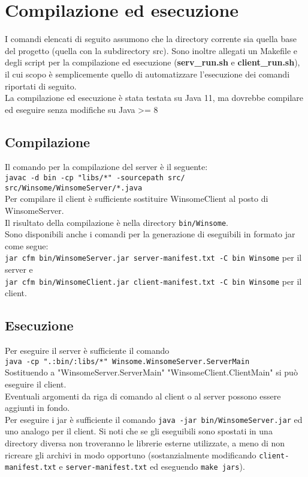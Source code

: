 \section{Compilazione ed esecuzione}
I comandi elencati di seguito assumono che la directory corrente sia quella base del progetto
(quella con la subdirectory src). Sono inoltre allegati un Makefile e degli script per la compilazione ed esecuzione (\textbf{serv\_run.sh} e \textbf{client\_run.sh}), il cui scopo è semplicemente quello di automatizzare l'esecuzione dei comandi riportati di seguito.\\
La compilazione ed esecuzione è stata testata su Java 11, ma dovrebbe compilare ed eseguire senza modifiche su Java >= 8

\subsection{Compilazione}
Il comando per la compilazione del server è il seguente:\\
\verb|javac -d bin -cp "libs/*" -sourcepath src/ src/Winsome/WinsomeServer/*.java|\\
Per compilare il client è sufficiente sostituire WinsomeClient al posto di WinsomeServer.\\
Il risultato della compilazione è nella directory \verb|bin/Winsome|.\\

Sono disponibili anche i comandi per la generazione di eseguibili in formato jar come segue:\\
\verb|jar cfm bin/WinsomeServer.jar server-manifest.txt -C bin Winsome| per il server e\\
\verb|jar cfm bin/WinsomeClient.jar client-manifest.txt -C bin Winsome| per il client.

\subsection{Esecuzione}
Per eseguire il server è sufficiente il comando\\
\verb|java -cp ".:bin/:libs/*" Winsome.WinsomeServer.ServerMain|\\
Sostituendo a "WinsomeServer.ServerMain" "WinsomeClient.ClientMain" si può eseguire il client.\\
Eventuali argomenti da riga di comando al client o al server possono essere aggiunti in fondo.\\
Per eseguire i jar è sufficiente il comando \verb|java -jar bin/WinsomeServer.jar| ed uno analogo per il client.
Si noti che se gli eseguibili sono spostati in una directory diversa non troveranno le librerie esterne utilizzate,
a meno di non ricreare gli archivi in modo opportuno (sostanzialmente modificando \verb|client-manifest.txt| e
 \verb|server-manifest.txt| ed eseguendo \verb|make jars|).

